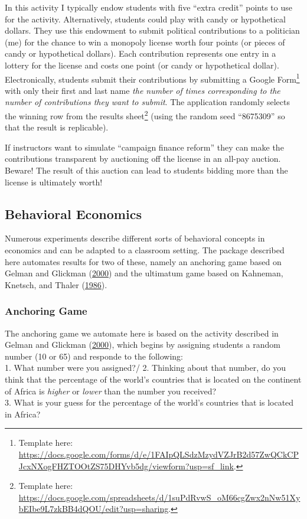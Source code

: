 \documentclass[
]{article}
\begin{document}
In this activity I typically endow students with five ``extra credit''
points to use for the activity. Alternatively, students could play with
candy or hypothetical dollars. They use this endowment to submit
political contributions to a politician (me) for the chance to win a
monopoly license worth four points (or pieces of candy or hypothetical
dollars). Each contribution represents one entry in a lottery for the
license and costs one point (or candy or hypothetical dollar).
Electronically, students submit their contributions by submitting a
Google Form\footnote{Template here:
  \url{https://docs.google.com/forms/d/e/1FAIpQLSdzMzydVZJrB2d57ZwQCkCPJcxNXogFHZTOOtZS75DHYvb5dg/viewform?usp=sf_link}.}
with only their first and last name \emph{the number of times
corresponding to the number of contributions they want to submit}. The
application randomly selects the winning row from the results
sheet\footnote{Template here:
  \url{https://docs.google.com/spreadsheets/d/1suPdRvwS_oM66cgZwx2nNw51XybEIbe9L7zkBB4dQOU/edit?usp=sharing}.}
(using the random seed ``8675309'' so that the result is replicable).

If instructors want to simulate ``campaign finance reform'' they can
make the contributions transparent by auctioning off the license in an
all-pay auction. Beware! The result of this auction can lead to students
bidding more than the license is ultimately worth!

\hypertarget{behavioral-economics}{%
\subsection{Behavioral Economics}\label{behavioral-economics}}

Numerous experiments describe different sorts of behavioral concepts in
economics and can be adapted to a classroom setting. The package
described here automates results for two of these, namely an anchoring
game based on Gelman and Glickman
(\protect\hyperlink{ref-gelman2000}{2000}) and the ultimatum game based
on Kahneman, Knetsch, and Thaler
(\protect\hyperlink{ref-kahneman1986}{1986}).

\hypertarget{anchoring-game}{%
\subsubsection{Anchoring Game}\label{anchoring-game}}

The anchoring game we automate here is based on the activity described
in Gelman and Glickman (\protect\hyperlink{ref-gelman2000}{2000}), which
begins by assigning students a random number (10 or 65) and responde to
the following:\\
1. What number were you assigned?/ 2. Thinking about that number, do you
think that the percentage of the world's countries that is located on
the continent of Africa is \emph{higher} or \emph{lower} than the number
you received?\\
3. What is your guess for the percentage of the world's countries that
is located in Africa?\\
\end{document}
